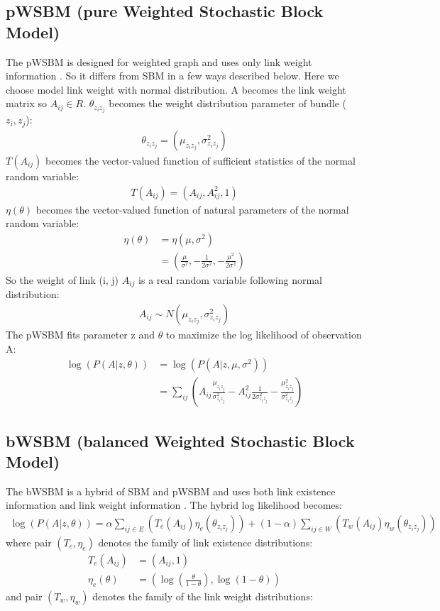 \documentclass[letterpaper]{article}
\begin{document}
\subsection{pWSBM (pure Weighted Stochastic Block Model)}
The pWSBM is designed for weighted graph and uses only link weight information \cite{aicher2014learning}.
So it differs from SBM in a few ways described below.
Here we choose model link weight with normal distribution.
A becomes the link weight matrix so $ A_{ij} \in R $.
$ \theta_{z_i z_j} $ becomes the weight distribution parameter of bundle ($z_i, z_j$):
\begin{align*}
	\theta_{z_i z_j} = (\mu_{z_i z_j}, \sigma_{z_i z_j}^2)
\end{align*}
$ T(A_{ij}) $ becomes the vector-valued function of sufficient statistics of the normal random variable:
\begin{align*}
	T(A_{ij}) = (A_{ij}, A_{ij}^2, 1)
\end{align*}
$ \eta(\theta) $ becomes the vector-valued function of natural parameters of the normal random variable:
\begin{align*}
	\eta(\theta)
	&= \eta(\mu, \sigma^2)\\
	&= (\frac{\mu}{\sigma^2}, -\frac{1}{2\sigma^2}, -\frac{\mu^2}{2\sigma^2})
\end{align*}
So the weight of link (i, j)  $ A_{ij} $ is a real random variable following normal distribution:
\begin{align*}
	A_{ij} \sim N(\mu_{z_i z_j}, \sigma_{z_i z_j}^2)
\end{align*}
The pWSBM fits parameter z and $ \theta $
to maximize the log likelihood of observation A:
\begin{align*}
\log(P(A|z, \theta))
&= \log(P(A|z, \mu, \sigma^2))\\
&= \sum_{ij} (
A_{ij} \frac{\mu_{z_i z_j}}{\sigma_{z_i z_j}^2}
- A_{ij}^2 \frac{1}{2\sigma_{z_i z_j}^2}
- \frac{\mu_{z_i z_j}^2}{\sigma_{z_i z_j}^2}
)
\end{align*}

\subsection{bWSBM (balanced Weighted Stochastic Block Model)}
The bWSBM is a hybrid of SBM and pWSBM
and uses both link existence information and link weight information \cite{aicher2014learning}.
The hybrid log likelihood becomes:
\begin{align*}
\log(P(A|z, \theta))
= \alpha \sum_{ij \in E} (T_e(A_{ij}) \eta_e(\theta_{z_i z_j}))
+ (1 - \alpha) \sum_{ij \in W} (T_w(A_{ij}) \eta_w(\theta_{z_i z_j}))
\end{align*}
where pair $ (T_e, \eta_e) $ denotes the family of link existence distributions:
\begin{align*}
T_e(A_{ij}) &= (A_{ij}, 1)\\
\eta_e(\theta) &= ( \log(\frac{\theta}{1-\theta}), \log(1-\theta) )
\end{align*}
and pair $ (T_w, \eta_w) $ denotes the family of the link weight distributions:
\end{document}
